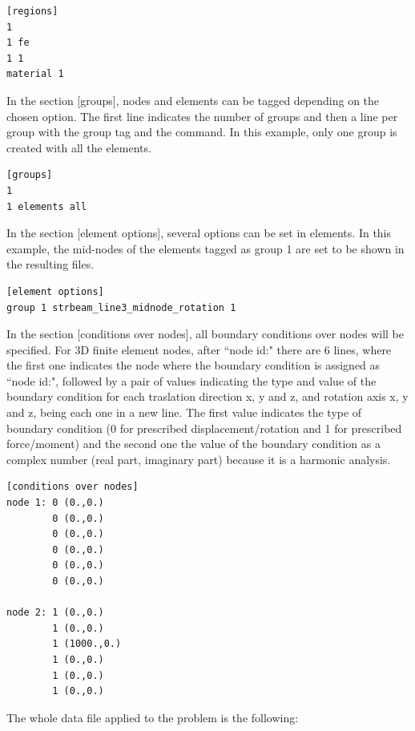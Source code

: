 \documentclass[a4]{article}
\begin{document}
\begin{Verbatim}	
[regions]
1
1 fe
1 1
material 1
\end{Verbatim}

In the section [groups], nodes and elements can be tagged depending on the chosen option. The first line indicates the number of groups and then a line per group with the group tag and the command. In this example, only one group is created with all the elements. 

\begin{Verbatim}
[groups]
1
1 elements all
\end{Verbatim}

In the section [element options], several options can be set in elements. In this example, the mid-nodes of the elements tagged as group 1 are set to be shown in the resulting files.  

\begin{Verbatim}
[element options]
group 1 strbeam_line3_midnode_rotation 1
\end{Verbatim}

In the section [conditions over nodes], all boundary conditions over nodes will be specified. For 3D finite element nodes, after ``node id:" there are 6 lines, where the first one indicates the node where the boundary condition is assigned as ``node id:", followed by a pair of values indicating the type and value of the boundary condition for each traslation direction x, y and z, and rotation axis x, y and z, being each one in a new line. The first value indicates the type of boundary condition (0 for prescribed displacement/rotation and 1 for prescribed force/moment) and the second one the value of the boundary condition as a complex number (real part, imaginary part) because it is a harmonic analysis. 

\begin{Verbatim}	
[conditions over nodes]
node 1: 0 (0.,0.)
        0 (0.,0.)
        0 (0.,0.)
        0 (0.,0.)
        0 (0.,0.)
        0 (0.,0.)

node 2: 1 (0.,0.)
        1 (0.,0.)
        1 (1000.,0.)
        1 (0.,0.)
        1 (0.,0.)
        1 (0.,0.)
\end{Verbatim}

The whole data file applied to the problem is the following:
\end{document}
